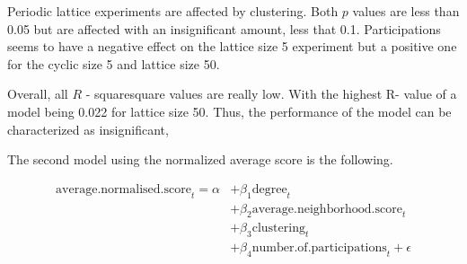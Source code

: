 Periodic lattice experiments are affected by clustering. Both \(p\) values
are less than 0.05 but are affected with an insignificant amount, less that 0.1.
Participations seems to have a negative effect on the lattice size 5 experiment
but a positive one for the cyclic size 5 and lattice size 50.

Overall, all \(R\) - squaresquare values  are really low. With the highest R- value of a
model being 0.022 for lattice size 50. Thus, the performance of the model can
be characterized as insignificant,

The second model using the normalized average score is the following.

\begin{align}
\mathrm{average.normalised.score}_{t} = \alpha
    &+ \beta_{1}  \mathrm{degree}_{t} \\
    &+ \beta_{2}  \mathrm{average.neighborhood.score}_{t}    \\
    &+ \beta_{3}  \mathrm{clustering}_{t} \\
    &+ \beta_{4}  \mathrm{number.of.participations}_{t} + \epsilon
\end{align}


